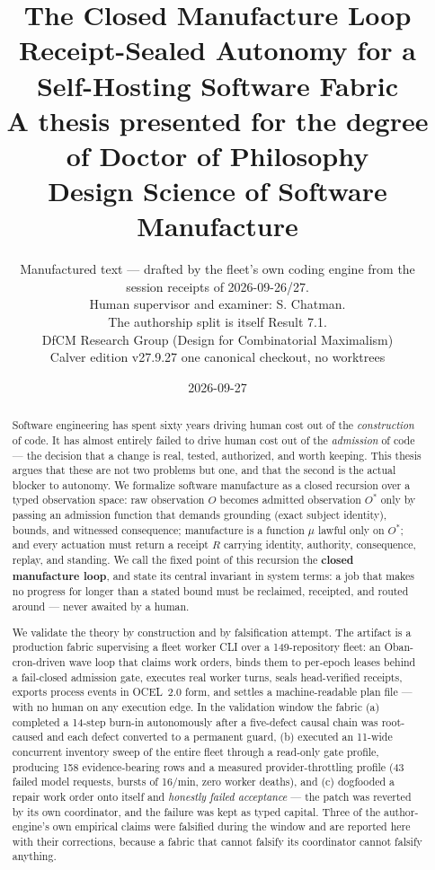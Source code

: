 \documentclass[11pt,a4paper]{article}
\title{\textbf{The Closed Manufacture Loop}\\[0.4em]
\large Receipt-Sealed Autonomy for a Self-Hosting Software Fabric\\[1.2em]
\normalsize A thesis presented for the degree of Doctor of Philosophy\\
\small Design Science of Software Manufacture}
\author{Manufactured text --- drafted by the fleet's own coding engine from the\\
session receipts of 2026-09-26/27.\\
Human supervisor and examiner: S. Chatman.\\[0.4em]
\small The authorship split is itself Result 7.1.\\
DfCM Research Group (Design for Combinatorial Maximalism)\\
Calver edition v27.9.27 \textbullet{} one canonical checkout, no worktrees}
\date{2026-09-27}
\theoremstyle{remark}
\newcommand{\Ostar}{$O^{*}$}
\begin{document}
\maketitle
\thispagestyle{empty}

\begin{abstract}
\noindent
Software engineering has spent sixty years driving human cost out of the \emph{construction} of code. It has almost entirely failed to drive human cost out of the \emph{admission} of code --- the decision that a change is real, tested, authorized, and worth keeping. This thesis argues that these are not two problems but one, and that the second is the actual blocker to autonomy. We formalize software manufacture as a closed recursion over a typed observation space: raw observation $O$ becomes admitted observation \Ostar{} only by passing an admission function that demands grounding (exact subject identity), bounds, and witnessed consequence; manufacture is a function $\mu$ lawful only on \Ostar{}; and every actuation must return a receipt $R$ carrying identity, authority, consequence, replay, and standing. We call the fixed point of this recursion the \textbf{closed manufacture loop}, and state its central invariant in system terms: a job that makes no progress for longer than a stated bound must be reclaimed, receipted, and routed around --- never awaited by a human.

We validate the theory by construction and by falsification attempt. The artifact is a production fabric supervising a fleet worker CLI over a 149-repository fleet: an Oban-cron-driven wave loop that claims work orders, binds them to per-epoch leases behind a fail-closed admission gate, executes real worker turns, seals head-verified receipts, exports process events in OCEL~2.0 form, and settles a machine-readable plan file --- with no human on any execution edge. In the validation window the fabric (a) completed a 14-step burn-in autonomously after a five-defect causal chain was root-caused and each defect converted to a permanent guard, (b) executed an 11-wide concurrent inventory sweep of the entire fleet through a read-only gate profile, producing 158 evidence-bearing rows and a measured provider-throttling profile (43 failed model requests, bursts of 16/min, zero worker deaths), and (c) dogfooded a repair work order onto itself and \emph{honestly failed acceptance} --- the patch was reverted by its own coordinator, and the failure was kept as typed capital. Three of the author-engine's own empirical claims were falsified during the window and are reported here with their corrections, because a fabric that cannot falsify its coordinator cannot falsify anything.


\end{abstract}
\end{document}
